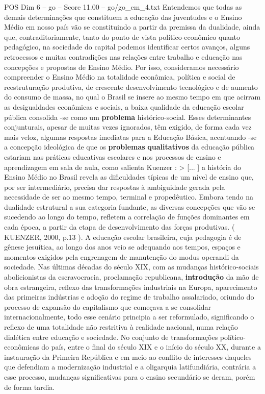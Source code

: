 \begin{textsample}{POS Dim 6 – go – Score 11.00 – go/go\_em\_4.txt}
Entendemos que todas as demais determinações que constituem a educação das juventudes e o Ensino Médio em nosso país vão se constituindo a partir da premissa da dualidade, ainda que, contraditoriamente, tanto do ponto de vista político-econômico quanto pedagógico, na sociedade do capital podemos identificar certos avanços, alguns retrocessos e muitas contradições nas relações entre trabalho e educação nas concepções e propostas de Ensino Médio.
Por isso, consideramos necessário compreender o Ensino Médio na totalidade econômica, política e social de reestruturação produtiva, de crescente desenvolvimento tecnológico e de aumento do consumo de massa, no qual o Brasil se insere ao mesmo tempo em que acirram as desigualdades econômicas e sociais, a baixa qualidade da educação escolar pública consolida -se como um \textbf{problema} histórico-social.
Esses determinantes conjunturais, apesar de muitas vezes ignorados, têm exigido, de forma cada vez mais veloz, algumas respostas imediatas para a Educação Básica, acentuando -se a concepção ideológica de que os \textbf{problemas} \textbf{qualitativos} da educação pública estariam nas práticas educativas escolares e nos processos de ensino e aprendizagem em sala de aula, como salienta Kuenzer : > [... ] a história do Ensino Médio no Brasil revela as dificuldades típicas de um nível de ensino que, por ser intermediário, precisa dar respostas à ambiguidade gerada pela necessidade de ser ao mesmo tempo, terminal e propedêutico.
Embora tendo na dualidade estrutural a sua categoria fundante, as diversas concepções que vão se sucedendo ao longo do tempo, refletem a correlação de funções dominantes em cada época, a partir da etapa de desenvolvimento das forças produtivas. ( KUENZER, 2000, p.13 ).
A educação escolar brasileira, cuja pedagogia é de gênese jesuítica, ao longo dos anos veio se adequando aos tempos, espaços e momentos exigidos pela engrenagem de manutenção do modus operandi da sociedade.
Nas últimas décadas do século XIX, com as mudanças histórico-sociais abolicionistas da escravocracia, proclamação republicana, \textbf{introdução} da mão de obra estrangeira, reflexo das transformações industriais na Europa, aparecimento das primeiras indústrias e adoção do regime de trabalho assalariado, oriundo do processo de expansão do capitalismo que começava a se consolidar internacionalmente, todo esse cenário principia a ser reformulado, significando o reflexo de uma totalidade não restritiva à realidade nacional, numa relação dialética entre educação e sociedade.
No conjunto de transformações político-econômicas do país, entre o final do século XIX e o início do século XX, durante a instauração da Primeira República e em meio ao conflito de interesses daqueles que defendiam a modernização industrial e a oligarquia latifundiária, contrária a esse processo, mudanças significativas para o ensino secundário se deram, porém de forma tardia.

\end{textsample}
